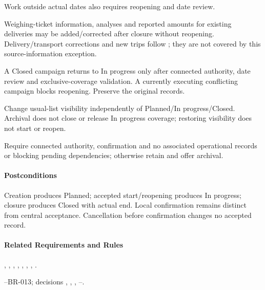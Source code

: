 \begin{description}[style=nextline]
Work outside actual dates also requires reopening and date review.
\item[A9 --- Late external information.] Weighing-ticket information, analyses and
reported amounts for existing deliveries may be added/corrected after closure
without reopening. Delivery/transport corrections and new trips follow
; they are not covered by this source-information exception.
\item[A10 --- Reopen.] A Closed campaign returns to In progress only after connected
authority, date review and exclusive-coverage validation. A currently executing
conflicting campaign blocks reopening. Preserve the original records.
\item[A11 --- Archive/restore.] Change usual-list visibility independently of
Planned/In progress/Closed. Archival does not close or release In progress coverage;
restoring visibility does not start or reopen.
\item[A12 --- Delete.] Require connected authority, confirmation and no associated
operational records or blocking pending dependencies; otherwise retain and offer archival.
\end{description}
\paragraph{Postconditions}
Creation produces Planned; accepted start/reopening produces In progress; closure
produces Closed with actual end. Local confirmation remains distinct from central
acceptance. Cancellation before confirmation changes no accepted record.
\paragraph{Related Requirements and Rules}
\hyperref[fr:004]{}, \hyperref[fr:010]{}, \hyperref[fr:014]{}, \hyperref[fr:015]{}, \hyperref[fr:016]{}, \hyperref[fr:017]{}, \hyperref[fr:018]{}, \hyperref[fr:019]{}.

--BR-013; decisions , , , --.
